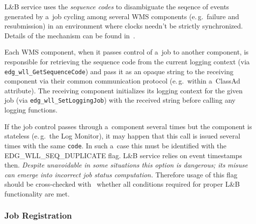 \documentclass{egee}
\def\LB{L\&B\xspace}
\def\eg{e.\,g.\xspace}
\begin{document}
\Description
\LB service uses the \emph{sequence codes} to disambiguate the seqence
of events generated by a~job cycling among several WMS components
(\eg\ failure and resubmission) in an environment where clocks needn't
be strictly synchronized.
Details of the mechanism can be found in~\cite{lbarch}.

Each WMS component, when it passes control of a~job to another component,
is responsible for retrieving the sequence code from the current logging
context (via \verb'edg_wll_GetSequenceCode')
and pass it as an opaque string to the receiving component via their common
communication protocol (\eg\ within a~ClassAd attribute).
The receiving component initializes its logging context for the given job
(via \verb'edg_wll_SetLoggingJob')
with the received string before calling any logging functions.

If the job control passes through a~component several times but the
component is stateless (\eg\ the Log Monitor),
it may happen that this call is issued several times with the same
\verb'code'.
In such a~case this must be identified with the
EDG\_WLL\_SEQ\_DUPLICATE flag. \LB service relies on event timestamps then.
\emph{Despite unavoidable in some situations this option is dangerous; 
its misuse can emerge into incorrect job status computation.}
Therefore usage of this flag should be cross-checked with~\cite{lbarch}
whether all conditions required for proper \LB functionality are met.

\Return

\subsubsection{Job Registration}

\Synopsis

\end{document}
